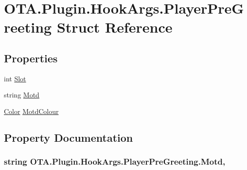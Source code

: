 \hypertarget{struct_o_t_a_1_1_plugin_1_1_hook_args_1_1_player_pre_greeting}{}\section{O\+T\+A.\+Plugin.\+Hook\+Args.\+Player\+Pre\+Greeting Struct Reference}
\label{struct_o_t_a_1_1_plugin_1_1_hook_args_1_1_player_pre_greeting}
\subsection*{Properties}
\begin{DoxyCompactItemize}
\item 
int \hyperlink{struct_o_t_a_1_1_plugin_1_1_hook_args_1_1_player_pre_greeting_a3e28270bcc3a819a4851e81d29e68b8c}{Slot}
\item 
string \hyperlink{struct_o_t_a_1_1_plugin_1_1_hook_args_1_1_player_pre_greeting_a4d8f5064d9eafb474598ce4759fb0f85}{Motd}
\item 
\hyperlink{struct_microsoft_1_1_xna_1_1_framework_1_1_color}{Color} \hyperlink{struct_o_t_a_1_1_plugin_1_1_hook_args_1_1_player_pre_greeting_a06a01994188da5c32fc729b7f73d7988}{Motd\+Colour}
\end{DoxyCompactItemize}


\subsection{Property Documentation}
\hypertarget{struct_o_t_a_1_1_plugin_1_1_hook_args_1_1_player_pre_greeting_a4d8f5064d9eafb474598ce4759fb0f85}{}
\subsubsection[{Motd}]{\setlength{\rightskip}{0pt plus 5cm}string O\+T\+A.\+Plugin.\+Hook\+Args.\+Player\+Pre\+Greeting.\+Motd\hspace{0.3cm}{\ttfamily [get]}, {\ttfamily [set]}}\label{struct_o_t_a_1_1_plugin_1_1_hook_args_1_1_player_pre_greeting_a4d8f5064d9eafb474598ce4759fb0f85}
\hypertarget{struct_o_t_a_1_1_plugin_1_1_hook_args_1_1_player_pre_greeting_a06a01994188da5c32fc729b7f73d7988}{}
